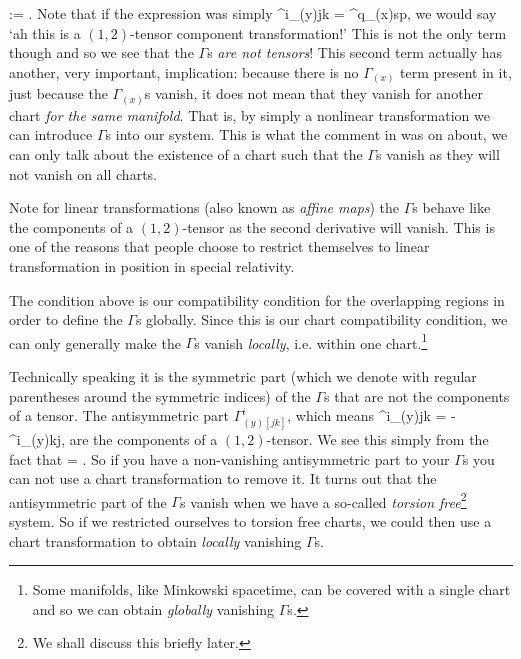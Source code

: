 \bse 
     :=  \bigg\la {}\bigg\ra.
\ese 
Note that if the expression was simply 
\bse 
    \Gamma^i_{(y)jk} =   \Gamma^{q}_{(x)sp},
\ese 
we would say `ah this is a $(1,2)$-tensor component transformation!' This is not the only term though and so we see that the $\Gamma$s \textit{are not tensors}! This second term actually has another, very important, implication: because there is no $\Gamma_{(x)}$ term present in it, just because the $\Gamma_{(x)}$s vanish, it does not mean that they vanish for another chart \textit{for the same manifold}. That is, by simply a nonlinear transformation we can introduce $\Gamma$s into our system. This is what the comment in  was on about, we can only talk about the existence of a chart such that the $\Gamma$s vanish as they will not vanish on all charts.

\br 
\label{rem:GammasTensorTransformation}
    Note for linear transformations (also known as \textit{affine maps}) the $\Gamma$s behave like the components of a $(1,2)$-tensor as the second derivative will vanish. This is one of the reasons that people choose to restrict themselves to linear transformation in position in special relativity.
\er 

The condition above is our compatibility condition for the overlapping regions in order to define the $\Gamma$s globally. Since this is our chart compatibility condition, we can only generally make the $\Gamma$s vanish \textit{locally}, i.e. within one chart.\footnote{Some manifolds, like Minkowski spacetime, can be covered with a single chart and so we can obtain \textit{globally} vanishing $\Gamma$s.}

\br 
    Technically speaking it is the symmetric part (which we denote with regular parentheses around the symmetric indices) of the $\Gamma$s that are not the components of a tensor. The antisymmetric part $\Gamma^i_{(y)[jk]}$, which means 
    \bse 
        \Gamma^i_{(y)jk} = - \Gamma^i_{(y)kj},
    \ese 
    are the components of a $(1,2)$-tensor. We see this simply from the fact that 
    \bse 
         = .
    \ese 
    So if you have a non-vanishing antisymmetric part to your $\Gamma$s you can not use a chart transformation to remove it. It turns out that the antisymmetric part of the $\Gamma$s vanish when we have a so-called \textit{torsion free}\footnote{We shall discuss this briefly later.} system. So if we restricted ourselves to torsion free charts, we could then use a chart transformation to obtain \textit{locally} vanishing $\Gamma$s.
\er 

